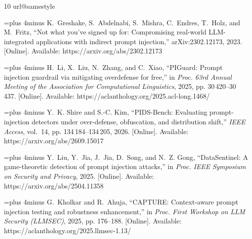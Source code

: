 \documentclass[conference]{IEEEtran}
\begin{document}
\begin{thebibliography}{10}
\providecommand{\url}[1]{#1}
\csname url@samestyle\endcsname
\providecommand{\newblock}{\relax}
\providecommand{\bibinfo}[2]{#2}
\providecommand{\BIBentrySTDinterwordspacing}{\spaceskip=0pt\relax}
\providecommand{\BIBentryALTinterwordstretchfactor}{4}
\providecommand{\BIBentryALTinterwordspacing}{\spaceskip=\fontdimen2\font plus
\BIBentryALTinterwordstretchfactor\fontdimen3\font minus
  \fontdimen4\font\relax}
\providecommand{\BIBforeignlanguage}[2]{{%
\expandafter\ifx\csname l@#1\endcsname\relax
\typeout{** WARNING: IEEEtran.bst: No hyphenation pattern has been}%
\typeout{** loaded for the language `#1'. Using the pattern for}%
\typeout{** the default language instead.}%
\else
\language=\csname l@#1\endcsname
\fi
#2}}
\providecommand{\BIBdecl}{\relax}
\BIBdecl

\BIBentryALTinterwordspacing
K.~Greshake, S.~Abdelnabi, S.~Mishra, C.~Endres, T.~Holz, and M.~Fritz, ``Not
  what you've signed up for: Compromising real-world {LLM}-integrated
  applications with indirect prompt injection,'' arXiv:2302.12173, 2023.
  [Online]. Available: \url{https://arxiv.org/abs/2302.12173}
\BIBentrySTDinterwordspacing

\BIBentryALTinterwordspacing
H.~Li, X.~Liu, N.~Zhang, and C.~Xiao, ``{PIGuard}: Prompt injection guardrail
  via mitigating overdefense for free,'' in \emph{Proc. 63rd Annual Meeting of
  the Association for Computational Linguistics}, 2025, pp. 30\,420--30\,437.
  [Online]. Available: \url{https://aclanthology.org/2025.acl-long.1468/}
\BIBentrySTDinterwordspacing

\BIBentryALTinterwordspacing
Y.~K. Shire and S.-C. Kim, ``{PIDS-Bench}: Evaluating prompt-injection
  detectors under over-defense, obfuscation, and distribution shift,''
  \emph{IEEE Access}, vol.~14, pp. 134\,184--134\,205, 2026. [Online].
  Available: \url{https://arxiv.org/abs/2609.15017}
\BIBentrySTDinterwordspacing

\BIBentryALTinterwordspacing
Y.~Liu, Y.~Jia, J.~Jia, D.~Song, and N.~Z. Gong, ``{DataSentinel}: A
  game-theoretic detection of prompt injection attacks,'' in \emph{Proc. IEEE
  Symposium on Security and Privacy}, 2025. [Online]. Available:
  \url{https://arxiv.org/abs/2504.11358}
\BIBentrySTDinterwordspacing

\BIBentryALTinterwordspacing
G.~Kholkar and R.~Ahuja, ``{CAPTURE}: Context-aware prompt injection testing
  and robustness enhancement,'' in \emph{Proc. First Workshop on LLM Security
  (LLMSEC)}, 2025, pp. 176--188. [Online]. Available:
  \url{https://aclanthology.org/2025.llmsec-1.13/}
\BIBentrySTDinterwordspacing


\end{thebibliography}
\end{document}
